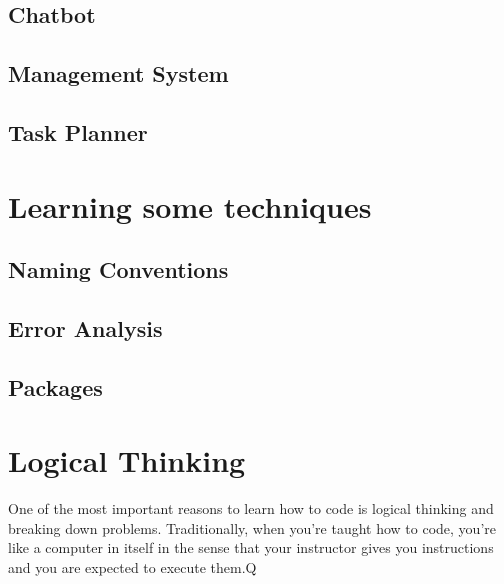 \documentclass[12pt,a4paper]{book}
\begin{document}
		\section{Chatbot}
			
		\section{Management System}
			
		\section{Task Planner}
			
	\chapter{Learning some techniques}  \label{chap:techniques}
		\section{Naming Conventions}

		\section{Error Analysis}

		\section{Packages}
	
	\chapter{Logical Thinking}  \label{chap:logical-thinking}
		One of the most important reasons to learn how to code is logical thinking and breaking down problems. Traditionally, when you're taught how to code, you're like a computer in itself in the sense that your instructor gives you instructions and you are expected to execute them.Q
\end{document}
